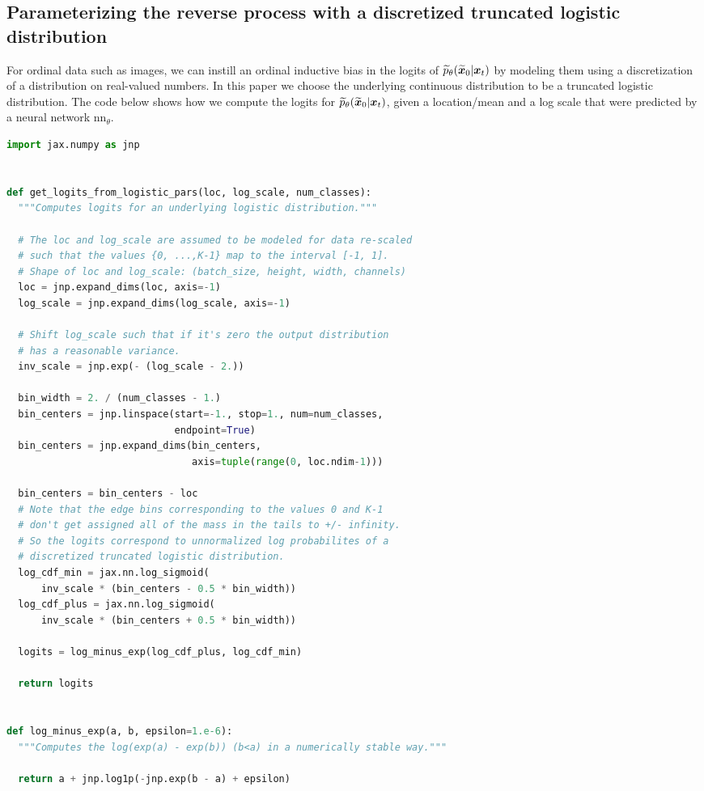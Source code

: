 \subsection{Parameterizing the reverse process with a discretized truncated logistic distribution}
\label{sec:appendix_logistic}
For ordinal data such as images, we can instill an ordinal inductive bias
in the logits of $\widetilde{p}_{\theta}(\widetilde{\boldsymbol{x}}_0|\boldsymbol{x}_t)$ by modeling them using a discretization of a distribution on real-valued numbers. In this paper we choose the underlying continuous distribution to be a truncated logistic distribution. The code below shows how we compute the logits for $\widetilde{p}_{\theta}(\widetilde{\boldsymbol{x}}_0|\boldsymbol{x}_t)$, given a location/mean and a log scale that were predicted by a neural network $\mathrm{nn}_{\theta}$.

\begin{lstlisting}[language=Python]
import jax.numpy as jnp
    
    
def get_logits_from_logistic_pars(loc, log_scale, num_classes):
  """Computes logits for an underlying logistic distribution."""

  # The loc and log_scale are assumed to be modeled for data re-scaled 
  # such that the values {0, ...,K-1} map to the interval [-1, 1].
  # Shape of loc and log_scale: (batch_size, height, width, channels)
  loc = jnp.expand_dims(loc, axis=-1)
  log_scale = jnp.expand_dims(log_scale, axis=-1)

  # Shift log_scale such that if it's zero the output distribution 
  # has a reasonable variance.
  inv_scale = jnp.exp(- (log_scale - 2.))

  bin_width = 2. / (num_classes - 1.)
  bin_centers = jnp.linspace(start=-1., stop=1., num=num_classes,
                             endpoint=True)
  bin_centers = jnp.expand_dims(bin_centers,
                                axis=tuple(range(0, loc.ndim-1)))

  bin_centers = bin_centers - loc
  # Note that the edge bins corresponding to the values 0 and K-1 
  # don't get assigned all of the mass in the tails to +/- infinity. 
  # So the logits correspond to unnormalized log probabilites of a 
  # discretized truncated logistic distribution.
  log_cdf_min = jax.nn.log_sigmoid(
      inv_scale * (bin_centers - 0.5 * bin_width))
  log_cdf_plus = jax.nn.log_sigmoid(
      inv_scale * (bin_centers + 0.5 * bin_width))

  logits = log_minus_exp(log_cdf_plus, log_cdf_min)

  return logits


def log_minus_exp(a, b, epsilon=1.e-6):
  """Computes the log(exp(a) - exp(b)) (b<a) in a numerically stable way."""

  return a + jnp.log1p(-jnp.exp(b - a) + epsilon)
\end{lstlisting}


